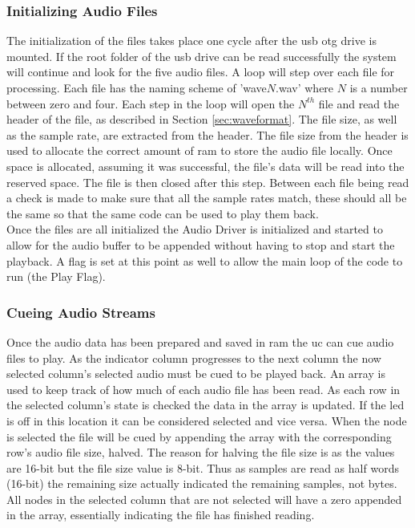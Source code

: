 \documentclass[12pt,a4paper]{report}
\begin{document}
\subsubsection{Initializing Audio Files}
The initialization of the files takes place one cycle after the \ac{usb} \ac{otg} drive is mounted. If the root folder of the \ac{usb} drive can be read successfully the system will continue and look for the five audio files. A loop will step over each file for processing. Each file has the naming scheme of 'wave$N$.wav' where $N$ is a number between zero and four. Each step in the loop will open the $N^{th}$ file and read the header of the file, as described in Section \ref{sec:waveformat}. The file size, as well as the sample rate, are extracted from the header. The file size from the header is used to allocate the correct amount of \ac{ram} to store the audio file locally. Once space is allocated, assuming it was successful, the file's data will be read into the reserved space. The file is then closed after this step. Between each file being read a check is made to make sure that all the sample rates match, these should all be the same so that the same code can be used to play them back.\\
Once the files are all initialized the Audio Driver \cite{audDrive} is initialized and started to allow for the audio buffer to be appended without having to stop and start the playback. A flag is set at this point as well to allow the main loop of the code to run (the Play Flag).
\subsubsection{Cueing Audio Streams}
Once the audio data has been prepared and saved in \ac{ram} the \ac{uc} can cue audio files to play. As the indicator column progresses to the next column the now selected column's selected audio must be cued to be played back. An array is used to keep track of how much of each audio file has been read. As each row in the selected column's state is checked the data in the array is updated. If the \ac{led} is off in this location it can be considered selected and vice versa. When the node is selected the file will be cued by appending the array with the corresponding row's audio file size, halved. The reason for halving the file size is as the values are 16-bit but the file size value is 8-bit. Thus as samples are read as half words (16-bit) the remaining size actually indicated the remaining samples, not bytes.  All nodes in the selected column that are not selected will have a zero appended in the array, essentially indicating the file has finished reading.
\end{document}
